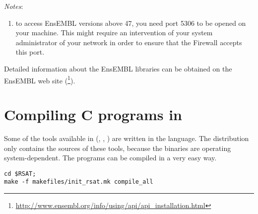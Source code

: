\documentclass[12pt,a4paper, oneside]{scrreprt} %
\begin{document}



\emph{Notes}: 
\begin{enumerate}
\item to access EnsEMBL versions above 47, you need port 5306 to be
  opened on your machine. This might require an intervention of your
  system administrator of your network in order to ensure that the
  Firewall accepts this port.
\end{enumerate}

Detailed information about the EnsEMBL libraries can be obtained on
the EnsEMBL web site
(\footnote{\url{http://www.ensembl.org/info/using/api/api\_installation.html}}).


\chapter{Compiling C programs in \RSAT}

Some of the tools available in \RSAT (,
, ) are written in the
 language. The distribution only contains the sources of
these tools, because the binaries are operating system-dependent. The
programs can be compiled in a very easy way.

\begin{lstlisting}
cd $RSAT;
make -f makefiles/init_rsat.mk compile_all
\end{lstlisting}
\end{document}
